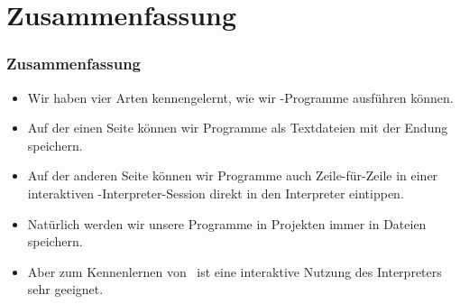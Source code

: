 \documentclass[aspectratio=169,mathserif,notheorems]{beamer}%
\begin{document}
\section{Zusammenfassung}%
%
\begin{frame}\frametitle{Zusammenfassung}%
\begin{itemize}%
\item Wir haben vier Arten kennengelernt, wie wir \python-Programme ausführen können.%
\item<2-> Auf der einen Seite können wir Programme als Textdateien mit der Endung~ speichern.%
\item<4-> Auf der anderen Seite können wir Programme auch Zeile-für-Zeile in einer interaktiven \python-Interpreter-Session direkt in den Interpreter eintippen.%
\item<6-> Natürlich werden wir unsere Programme in  Projekten immer in Dateien speichern.%
\item<7-> Aber zum Kennenlernen von \python\ ist eine interaktive Nutzung des Interpreters sehr geeignet.%
\end{itemize}%
\end{frame}%
%
\endPresentation%
\end{document}
